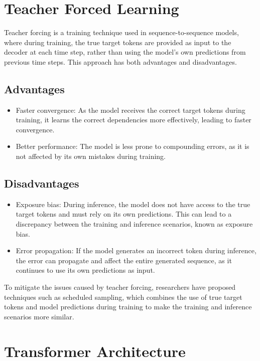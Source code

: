 \documentclass[12pt]{article}
\begin{document}
\section{Teacher Forced Learning}
\label{sec:teacher_forced_learning}

Teacher forcing is a training technique used in sequence-to-sequence models, where during training, the true target tokens are provided as input to the decoder at each time step, rather than using the model's own predictions from previous time steps. This approach has both advantages and disadvantages.

\subsection{Advantages}
\begin{itemize}
    \item Faster convergence: As the model receives the correct target tokens during training, it learns the correct dependencies more effectively, leading to faster convergence.
    \item Better performance: The model is less prone to compounding errors, as it is not affected by its own mistakes during training.
\end{itemize}

\subsection{Disadvantages}
\begin{itemize}
    \item Exposure bias: During inference, the model does not have access to the true target tokens and must rely on its own predictions. This can lead to a discrepancy between the training and inference scenarios, known as exposure bias.
    \item Error propagation: If the model generates an incorrect token during inference, the error can propagate and affect the entire generated sequence, as it continues to use its own predictions as input.
\end{itemize}
To mitigate the issues caused by teacher forcing, researchers have proposed techniques such as scheduled sampling, which combines the use of true target tokens and model predictions during training to make the training and inference scenarios more similar.

\section{Transformer Architecture}
\end{document}
